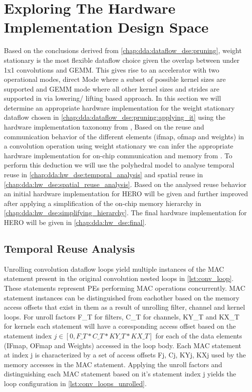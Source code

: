 
\section{Exploring The Hardware Implementation Design Space}
\label{chap:dda:hw_dse}

Based on the conclusions derived from \autoref{chap:dda:dataflow_dse:pruning},
weight stationary is the most flexible dataflow choice given the overlap between
under 1x1 convolutions and GEMM. This gives rise to an accelerator with two
operational modes, direct Mode where a subset of possible kernel sizes are
supported and GEMM mode where all other kernel sizes and strides are supported
in via lowering/ lifting based approach. In this section we will determine an
appropriate hardware implementation for the weight stationary dataflow chosen in
\autoref{chap:dda:dataflow_dse:pruning:applying_it} using the hardware
implementation taxonomy from \cite{maestro}, Based on the reuse and
communication behavior of the different elements (ifmap, ofmap and weights) in a
convolution operation using weight stationary we can infer the appropriate
hardware implementation for on-chip communication and memory from
\cite{maestro}. To perform this deduction we will use the polyhedral model to
analyse temporal reuse in \autoref{chap:dda:hw_dse:temporal_analysis} and
spatial reuse in \autoref{chap:dda:hw_dse:spatial_reuse_analysis}. Based on the
analysed reuse behavior an initial hardware implementation for HERO will be
given and further improved after applying a simplification of the on-chip memory
hierarchy in \autoref{chap:dda:hw_dse:simplifying_hierarchy}. The final hardware
implementation for HERO will be given in \autoref{chap:dda:hw_dse:final}.

\subsection{Temporal Reuse Analysis}
\label{chap:dda:hw_dse:temporal_analysis}

Unrolling convolution dataflow loops yield multiple instances of the \ac{MAC}
statement present in the original convolution nested loops in
\autoref{lst:conv_loop}. These statements represent \ac{PE}s performing MAC
operations concurrently. 
\ac{MAC} statement instances can be distinguished from eachother based on the memory access offsets that
exist in them as a result of unrolling filter, channel and kernel loops. For
unroll factors F\_T for filters, C\_T for channels, KY\_T and KX\_T for kernels
each statement will have a coresponding access offset based on the statement
index $j \in [0, F\_T*C\_T*KY\_T*KX\_T]$ for each of the data elements
(IFmap, OFmap and Weights) accessed in the loop body. Each \ac{MAC} statement
at index j is characterized by a set of access offsets {Fj, Cj, KYj,
KXj} used by the memory accesses in the \ac{MAC} statement. Applying the unroll
factors and distinguishing each \ac{MAC} statement based on it's statement index
j yields the loop configuration in \autoref{lst:conv_loops_unrolled}. 


